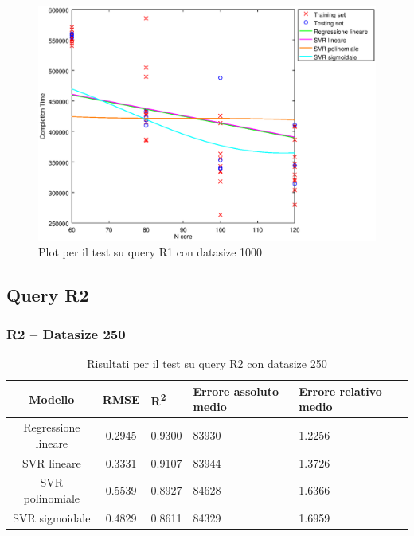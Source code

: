 \documentclass[a4paper,11pt]{article}
\begin{document}
\begin {figure}[hbtp]
\centering
\includegraphics[width=\textwidth]{output/R1_1000/plot_R1_1000.eps}
\caption {Plot per il test su query R1 con datasize 1000}
\end {figure}

\newpage
\subsection{Query R2}

\subsubsection{R2 -- Datasize 250}
\begin{table}[bhpt]
	\centering
	\begin{adjustbox}{center}
		\begin{tabular}{c | c M{1cm} M{2.5cm} M{2.5cm} M{1.8cm}}
			Modello & RMSE & R\textsuperscript{2} & Errore assoluto medio & Errore relativo medio \tabularnewline
			\hline
			Regressione lineare & 0.2945 & 0.9300 &  83930 & 1.2256 \\
			SVR lineare & 0.3331 & 0.9107 &  83944 & 1.3726 \\
			SVR polinomiale & 0.5539 & 0.8927 &  84628 & 1.6366 \\
			SVR sigmoidale & 0.4829 & 0.8611 &  84329 & 1.6959 \\
		\end{tabular}
	\end{adjustbox}
	\\
	\caption{Risultati per il test su query R2 con datasize 250}
	\label{table_R2_250}
\end{table}
\end{document}
